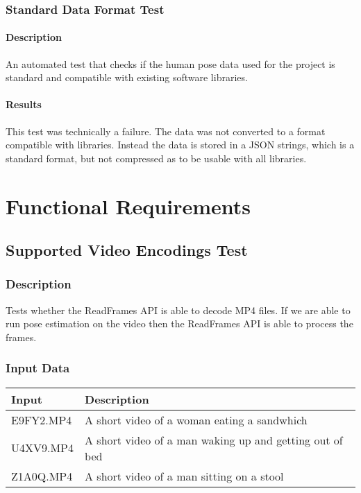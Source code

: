 \documentclass{scrreprt}
\begin{document}
\subsection{Standard Data Format Test}
\subsubsection{Description}
\begin{flushleft}
An automated test that checks if the human pose data used for the project is standard and compatible with existing software libraries.
\end{flushleft}
\subsubsection{Results}
\begin{flushleft}
This test was technically a failure. The data was not converted to a format compatible with libraries. Instead the data is stored in a JSON strings, which is a standard format, but not compressed as to be usable with all libraries.
\end{flushleft}

\chapter{Functional Requirements}
\section{Supported Video Encodings Test}
\subsection{Description}
\begin{flushleft}
Tests whether the ReadFrames API is able to decode MP4 files. If we are able to run pose estimation on the video then the ReadFrames API is able to process the frames.
\end{flushleft}
\subsection{Input Data}
 \centering
 \begin{tabular}{p{3cm}p{6cm}}
 \hline\hline
 Input & Description\\
 \hline\hline
 E9FY2.MP4  &  A short video of a woman eating a sandwhich\\
 \hline
 U4XV9.MP4  &  A short video of a man waking up and getting out of bed\\
 \hline
 Z1A0Q.MP4 & A short video of a man sitting on a stool\\
 \hline
 \end{tabular}
\end{document}
